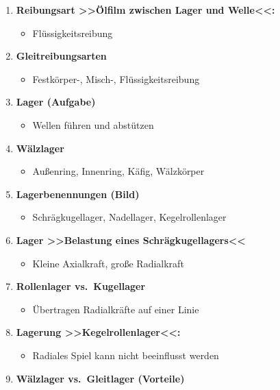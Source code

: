 \begin{enumerate}
\item
  \textbf{Reibungsart >>Ölfilm zwischen Lager und Welle<<:}

  \begin{itemize}
  \item
    Flüssigkeitsreibung
  \end{itemize}
\item
  \textbf{Gleitreibungsarten}

  \begin{itemize}
  \item
    Festkörper-, Misch-, Flüssigkeitsreibung
  \end{itemize}
\item
  \textbf{Lager (Aufgabe)}

  \begin{itemize}
  \item
    Wellen führen und abstützen
  \end{itemize}
\item
  \textbf{Wälzlager}

  \begin{itemize}
  \item
    Außenring, Innenring, Käfig, Wälzkörper
  \end{itemize}
\item
  \textbf{Lagerbenennungen (Bild)}

  \begin{itemize}
  \item
    Schrägkugellager, Nadellager, Kegelrollenlager
  \end{itemize}
\item
  \textbf{Lager >>Belastung eines Schrägkugellagers<<}

  \begin{itemize}
  \item
    Kleine Axialkraft, große Radialkraft
  \end{itemize}
\item
  \textbf{Rollenlager vs.~Kugellager}

  \begin{itemize}
  \item
    Übertragen Radialkräfte auf einer Linie
  \end{itemize}
\item
  \textbf{Lagerung >>Kegelrollenlager<<:}

  \begin{itemize}
  \item
    Radiales Spiel kann nicht beeinflusst werden
  \end{itemize}
\item
  \textbf{Wälzlager vs.~Gleitlager (Vorteile)}


\end{enumerate}
